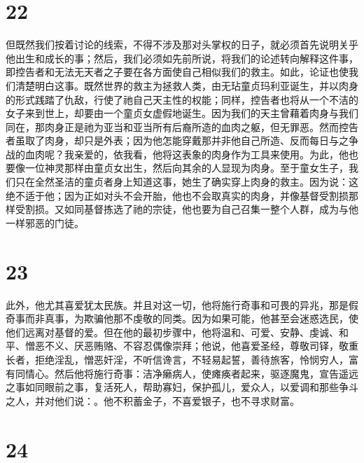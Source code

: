 \section{22}

但既然我们按着讨论的线索，不得不涉及那对头掌权的日子，就必须首先说明关乎他出生和成长的事；然后，我们必须如先前所说，将我们的论述转向解释这件事，即控告者和无法无天者之子要在各方面使自己相似我们的救主。如此，论证也使我们清楚明白这事。既然世界的救主为拯救人类，由无玷童贞玛利亚诞生，并以肉身的形式践踏了仇敌，行使了祂自己天主性的权能；同样，控告者也将从一个不洁的女子来到世上，却要由一个童贞女虚假地诞生。因为我们的天主曾藉着肉身与我们同在，那肉身正是祂为亚当和亚当所有后裔所造的血肉之躯，但无罪恶。然而控告者虽取了肉身，却只是外表；因为他怎能穿戴那并非他自己所造、反而每日与之争战的血肉呢？我亲爱的，依我看，他将这表象的肉身作为工具来使用。为此，他也要像一位神灵那样由童贞女出生，然后向其余的人显现为肉身。至于童女生子，我们只在全然圣洁的童贞者身上知道这事，她生了确实穿上肉身的救主。因为说：这绝不适于他；因为正如对头不会开胎，他也不会取真实的肉身，并像基督受割损那样受割损。又如同基督拣选了祂的宗徒，他也要为自己召集一整个人群，成为与他一样邪恶的门徒。\par


\section{23}

此外，他尤其喜爱犹太民族。并且对这一切，他将施行奇事和可畏的异兆，那是假奇事而非真事，为欺骗他那不虔敬的同类。因为如果可能，他甚至会迷惑选民，使他们远离对基督的爱。但在他的最初步骤中，他将温和、可爱、安静、虔诚、和平、憎恶不义、厌恶贿赂、不容忍偶像崇拜；他说，他喜爱圣经，尊敬司铎，敬重长者，拒绝淫乱，憎恶奸淫，不听信谗言，不轻易起誓，善待旅客，怜悯穷人，富有同情心。然后他将施行奇事：洁净癞病人，使瘫痪者起来，驱逐魔鬼，宣告遥远之事如同眼前之事，复活死人，帮助寡妇，保护孤儿，爱众人，以爱调和那些争斗之人，并对他们说：。他不积蓄金子，不喜爱银子，也不寻求财富。\par


\section{24}

